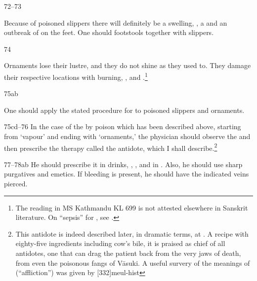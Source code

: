 \begin{translation}
\item[72--73]

Because of poisoned slippers there will definitely be a
swelling, , a  and an
outbreak of  on the feet. One should  footstools together with slippers.

\item[74]

Ornaments lose their lustre, and they do not shine as they used to.
They damage their respective locations with  burning, 
, and .\footnote{The reading 
 in MS Kathmandu KL 699 is not attested elsewhere in Sanskrit 
literature.  On “sepsis” for , see \cite[xlv--xlvi]{wuja-2003}.}

\item[75ab]

One should apply the stated procedure for  to
poisoned slippers and ornaments.

\item[75cd--76]  In the case of the  by
poison which has been described above, starting from `vapour' and
ending with `ornaments,' the physician should observe the
 and then prescribe the therapy called the
 antidote,  which I shall
describe.\footnote{This antidote is indeed described later, in
    dramatic terms, at .  A recipe with eighty-five
    ingredients including cow's bile, it is praised as chief of all
    antidotes, one that can drag the patient back from the very jaws of
    death, from even the poisonous fangs of Vāsuki. A useful survery of the 
    meanings of  (“affliction”) was given by 
    [332]{meul-hist}}



\item [77--78ab] He should prescribe it in drinks, ,
, and in .  Also, he should use 
sharp
purgatives and emetics.  If bleeding is present, he should have the
indicated veins pierced.



\end{translation}

